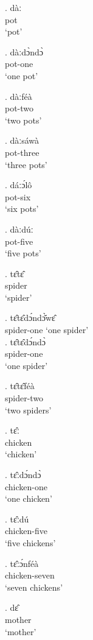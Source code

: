 \documentclass{assets/fieldnotes}
\begin{document}
\exg. dàː\\
pot\\
`pot'

\exg. dàːdɔ̀ndɔ̀\\
pot-one\\
`one pot'

\exg. dàːféà\\
pot-two\\
`two pots'

\exg. dàːsáwà\\
pot-three\\
`three pots'

\exg. dáːɔ́lô\\
pot-six\\
`six pots'

\exg. dàːdúː\\
pot-five\\
`five pots'


\exg. tɛ̂tɛ̂\\
    spider\\
    `spider'

\exg. tɛ̂tɛ̂dɔ́ndɔ̀̆wɛ̂\\
spider-one
`one spider' \\

\exg. tɛ̂tɛ̂dɔ́ndɔ̀\\
spider-one\\
`one spider' 

\exg. tɛ̂tɛ̂féà\\
spider-two\\
`two spiders'
    
\exg. tɛ̂ː\\
    chicken\\
    `chicken'

 \exg. tɛ̂ːdɔ́ndɔ̀\\
 chicken-one\\
`one chicken'

\exg. tɛ̂ːdú\\
chicken-five\\
`five chickens'

\exg. tɛ̂ːɔ́nféà\\
chicken-seven\\
`seven chickens'

\exg. dɛ̂\\
mother\\
`mother' 

\end{document}
